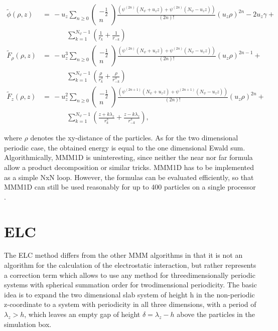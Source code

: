 \[ \begin{array}{rl} \tilde{\phi}(\rho,z) &=\, -u_z\sum_{n\ge 0}
  \left(\begin{array}{c}-\frac{1}{2}\\n\end{array}\right)
  \frac{\left(\psi^{(2n)}(N_\psi + u_z z) + \psi^{(2n)}(N_\psi - u_z
      z)\right)}{(2n)!}(u_z\rho)^{2n} - 2u_z\gamma + \\
  &\phantom{=\,++}
  \sum_{k=1}^{N_\psi-1}\left(\frac{1}{r_k}+\frac{1}{r_{-k}}\right)\\
  \tilde{F}_\rho(\rho,z) &=\, -u_z^3 \sum_{n\ge 0}
  \left(\begin{array}{c}-\frac{1}{2}\\n\end{array}\right)
  \frac{\left(\psi^{(2n)}(N_\psi + u_z z) + \psi^{(2n)}(N_\psi - u_z
      z)\right)}{(2n)!}(u_z\rho)^{2n-1} + \\ &\phantom{=\,++}
  \sum_{k=1}^{N_\psi-1}\left(\frac{\rho}{r_k^3}+\frac{\rho}{r_{-k}^3}\right)
  \\ \tilde{F}_z(\rho,z) &=\, -u_z^2 \sum_{n\ge 0}
  \left(\begin{array}{c}-\frac{1}{2}\\n\end{array}\right)
  \frac{\left(\psi^{(2n + 1)}(N_\psi + u_z z) + \psi^{(2n + 1)}(N_\psi
      - u_z z)\right)}{(2n)!}(u_z\rho)^{2n} + \\ &\phantom{=\,++}
  \sum_{k=1}^{N_\psi-1}\left(\frac{z+k\lambda_z}{r_k^3}+\frac{z-k\lambda_z}{r_{-k}^3}\right),
\end{array} \]

where $\rho$ denotes the xy-distance of the particles. As for the two
dimensional periodic case, the obtained energy is equal to the one
dimensional Ewald sum. Algorithmically, MMM1D is uninteresting, since
neither the near nor far formula allow a product decomposition or
similar tricks. MMM1D has to be implemented as a simple NxN loop.
However, the formulas can be evaluated efficiently, so that MMM1D can
still be used reasonably for up to 400 particles on a single
processor \citep{arnold05b}.

\section{ELC}

The ELC method differs from the other MMM algorithms in that it is not
an algorithm for the calculation of the electrostatic interaction, but
rather represents a correction term which allows to use any method for
threedimensionally periodic systems with spherical summation order for
twodimensional periodicity. The basic idea is to expand the two
dimensional slab system of height h in the non-periodic z-coordinate
to a system with periodicity in all three dimensions, with a period of
$\lambda_z>h$, which leaves an empty gap of height $\delta=\lambda_z -
h$ above the particles in the simulation box.

